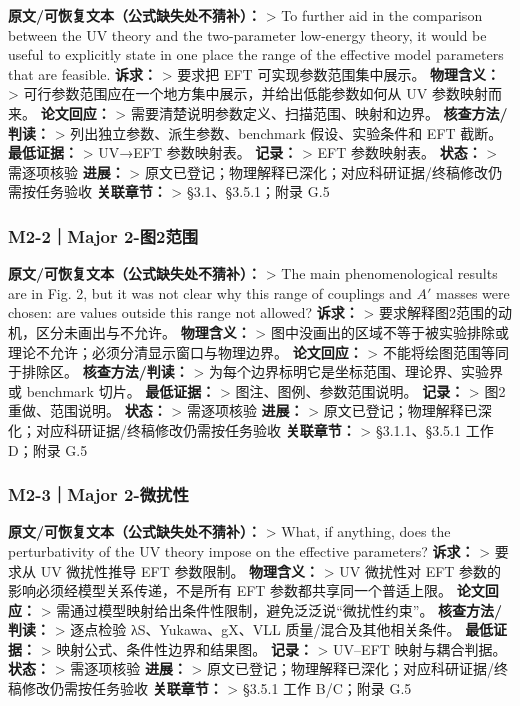 \documentclass[
]{article}
\begin{document}
\textbf{原文/可恢复文本（公式缺失处不猜补）：} \textgreater{} To further
aid in the comparison between the UV theory and the two-parameter
low-energy theory, it would be useful to explicitly state in one place
the range of the effective model parameters that are feasible.
\textbf{诉求：} \textgreater{} 要求把 EFT 可实现参数范围集中展示。
\textbf{物理含义：} \textgreater{}
可行参数范围应在一个地方集中展示，并给出低能参数如何从 UV 参数映射而来。
\textbf{论文回应：} \textgreater{}
需要清楚说明参数定义、扫描范围、映射和边界。 \textbf{核查方法/判读：}
\textgreater{} 列出独立参数、派生参数、benchmark 假设、实验条件和 EFT
截断。 \textbf{最低证据：} \textgreater{} UV→EFT 参数映射表。
\textbf{记录：} \textgreater{} EFT 参数映射表。 \textbf{状态：}
\textgreater{} 需逐项核验 \textbf{进展：} \textgreater{}
原文已登记；物理解释已深化；对应科研证据/终稿修改仍需按任务验收
\textbf{关联章节：} \textgreater{} §3.1、§3.5.1；附录 G.5

\subsubsection{M2-2｜Major
2-图2范围}\label{m2-2major-2-ux56fe2ux8303ux56f4}

\textbf{原文/可恢复文本（公式缺失处不猜补）：} \textgreater{} The main
phenomenological results are in Fig. 2, but it was not clear why this
range of couplings and \(A'\) masses were chosen: are values outside
this range not allowed? \textbf{诉求：} \textgreater{}
要求解释图2范围的动机，区分未画出与不允许。 \textbf{物理含义：}
\textgreater{}
图中没画出的区域不等于被实验排除或理论不允许；必须分清显示窗口与物理边界。
\textbf{论文回应：} \textgreater{} 不能将绘图范围等同于排除区。
\textbf{核查方法/判读：} \textgreater{}
为每个边界标明它是坐标范围、理论界、实验界或 benchmark 切片。
\textbf{最低证据：} \textgreater{} 图注、图例、参数范围说明。
\textbf{记录：} \textgreater{} 图2重做、范围说明。 \textbf{状态：}
\textgreater{} 需逐项核验 \textbf{进展：} \textgreater{}
原文已登记；物理解释已深化；对应科研证据/终稿修改仍需按任务验收
\textbf{关联章节：} \textgreater{} §3.1.1、§3.5.1 工作 D；附录 G.5

\subsubsection{M2-3｜Major
2-微扰性}\label{m2-3major-2-ux5faeux6270ux6027}

\textbf{原文/可恢复文本（公式缺失处不猜补）：} \textgreater{} What, if
anything, does the perturbativity of the UV theory impose on the
effective parameters? \textbf{诉求：} \textgreater{} 要求从 UV
微扰性推导 EFT 参数限制。 \textbf{物理含义：} \textgreater{} UV 微扰性对
EFT 参数的影响必须经模型关系传递，不是所有 EFT
参数都共享同一个普适上限。 \textbf{论文回应：} \textgreater{}
需通过模型映射给出条件性限制，避免泛泛说``微扰性约束''。
\textbf{核查方法/判读：} \textgreater{} 逐点检验 λS、Yukawa、gX、VLL
质量/混合及其他相关条件。 \textbf{最低证据：} \textgreater{}
映射公式、条件性边界和结果图。 \textbf{记录：} \textgreater{} UV--EFT
映射与耦合判据。 \textbf{状态：} \textgreater{} 需逐项核验
\textbf{进展：} \textgreater{}
原文已登记；物理解释已深化；对应科研证据/终稿修改仍需按任务验收
\textbf{关联章节：} \textgreater{} §3.5.1 工作 B/C；附录 G.5
\end{document}
